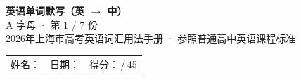 \documentclass[10pt,a4paper]{article}
\begin{document}
\pagestyle{plain}

\begin{center}
{\LARGE\bfseries 英语单词默写（英 $\to$ 中）}\\[0.22em]
{\large A 字母 · 第 1 / 7 份}\\[0.18em]
{\small 2026年上海市高考英语词汇用法手册 · 参照普通高中英语课程标准}
\end{center}

\vspace{0.25em}
\noindent\begin{tabular}{@{}p{}@{}p{}@{}p{}@{}}
姓名：\underline{\hspace{2.0cm}} & 日期：\underline{\hspace{2.0cm}} & 得分：\underline{\hspace{1.3cm}}\,/\,45 \\
\end{tabular}

\vspace{0.3em}

\vspace{0.08em}
\end{document}
